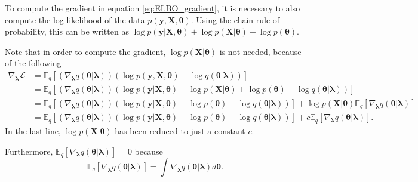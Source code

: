 To compute the gradient in equation \eqref{eq:ELBO_gradient}, it is necessary to also compute the log-likelihood of the data $p(\boldsymbol{y}, \boldsymbol{X}, \boldsymbol{\theta})$. Using the chain rule of probability, this can be written as $\log p(\boldsymbol{y} | \boldsymbol{X}, \boldsymbol{\theta}) + \log p(\boldsymbol{X} | \boldsymbol{\theta}) + \log p(\boldsymbol{\theta})$.

Note that in order to compute the gradient, $\log p(\boldsymbol{X} | \boldsymbol{\theta})$ is not needed, because of the following
\begin{equation*}
  \begin{split}
      \nabla_{\boldsymbol{\lambda}} \mathcal{L} &=
      \mathbb{E}_q \left[ \left( \nabla_{\boldsymbol{\lambda}} q(\boldsymbol{\theta} | \boldsymbol{\lambda}) \right) \left( \log p(\boldsymbol{y}, \boldsymbol{X}, \boldsymbol{\theta}) - \log q(\boldsymbol{\theta} | \boldsymbol{\lambda}) \right) \right] \\
      &= \mathbb{E}_q \left[ \left( \nabla_{\boldsymbol{\lambda}} q(\boldsymbol{\theta} | \boldsymbol{\lambda}) \right) \left( \log p(\boldsymbol{y} | \boldsymbol{X}, \boldsymbol{\theta}) + \log p(\boldsymbol{X} | \boldsymbol{\theta}) + \log p(\boldsymbol{\theta}) - \log q(\boldsymbol{\theta} | \boldsymbol{\lambda}) \right) \right] \\
      &= \mathbb{E}_q \left[ \left( \nabla_{\boldsymbol{\lambda}} q(\boldsymbol{\theta} | \boldsymbol{\lambda}) \right) \left( \log p(\boldsymbol{y} | \boldsymbol{X}, \boldsymbol{\theta}) + \log p(\boldsymbol{\theta}) - \log q(\boldsymbol{\theta} | \boldsymbol{\lambda}) \right) \right] +  \log p(\boldsymbol{X} | \boldsymbol{\theta}) \mathbb{E}_q \left[ \nabla_{\boldsymbol{\lambda}} q(\boldsymbol{\theta} | \boldsymbol{\lambda}) \right] \\
      &= \mathbb{E}_q \left[ \left( \nabla_{\boldsymbol{\lambda}} q(\boldsymbol{\theta} | \boldsymbol{\lambda}) \right) \left( \log p(\boldsymbol{y} | \boldsymbol{X}, \boldsymbol{\theta}) + \log p(\boldsymbol{\theta}) - \log q(\boldsymbol{\theta} | \boldsymbol{\lambda}) \right) \right] +  c \mathbb{E}_q \left[ \nabla_{\boldsymbol{\lambda}} q(\boldsymbol{\theta} | \boldsymbol{\lambda}) \right].
  \end{split}
\end{equation*}
In the last line, $\log p(\boldsymbol{X} | \boldsymbol{\theta})$ has been reduced to just a constant $c$.

Furthermore, $\mathbb{E}_q \left[ \nabla_{\boldsymbol{\lambda}} q(\boldsymbol{\theta} | \boldsymbol{\lambda}) \right] = 0$ because
\begin{equation}
  \mathbb{E}_q \left[ \nabla_{\boldsymbol{\lambda}} q(\boldsymbol{\theta} | \boldsymbol{\lambda}) \right] =
      \int \nabla_{\boldsymbol{\lambda}} q(\boldsymbol{\theta} | \boldsymbol{\lambda}) d\boldsymbol{\theta}.
\end{equation}

